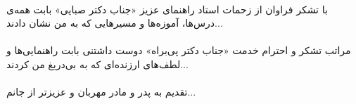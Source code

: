 
\thispagestyle{empty}


\paragraph*{}
با تشکر فراوان از زحمات استاد راهنمای عزیز «جناب دکتر صبایی» بابت همه‌ی درس‌ها، آموزه‌ها و مسیرهایی که به من نشان دادند...

\paragraph*{}
مراتب تشکر و احترام خدمت «جناب دکتر پی‌براه» دوست داشتنی بابت راهنمایی‌ها و لطف‌های ارزنده‌ای که به بی‌دریغ من کردند...

\paragraph*{}
تقدیم به پدر و مادر مهربان و عزیزتر از جانم...